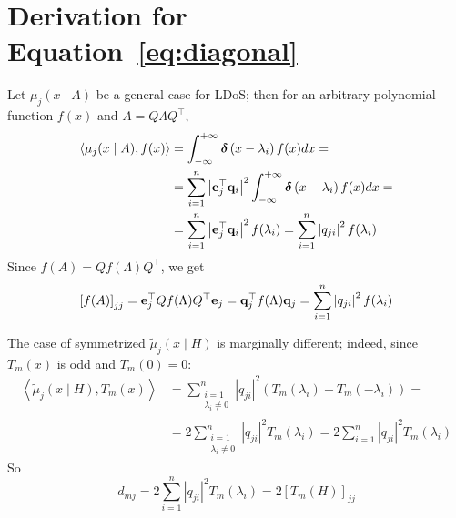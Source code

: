 \section{Derivation for Equation~\ref{eq:diagonal}}\label{app:eq11}

Let \( \mu_j ( x \mid A )  \) be a general case for LDoS; then for an arbitrary polynomial function \( f(x) \) and \( A = Q \Lambda Q^\top \),
\begin{equation}
   \begin{aligned}
         \left\langle  \mu_j ( x \mid A ), f(x) \right\rangle & = \int_{-\infty}^{+\infty}  \bm\delta \left( x - \lambda_i \right) f(x) dx = \\
         & = \sum_{i=1}^{n} \left| \mathbf{e}_j^\top \mathbf{q}_i \right|^2 \int_{-\infty}^{+\infty}  \bm\delta \left( x - \lambda_i \right) f(x) dx = \\
         & = \sum_{i=1}^{n} \left| \mathbf{e}_j^\top \mathbf{q}_i \right|^2 f(\lambda_i) =  \sum_{i=1}^{n} \left| q_{ji} \right|^2 f(\lambda_i) 
   \end{aligned}
\end{equation}
Since \( f(A) = Q f(\Lambda) Q^\top \), we get
\begin{equation}
      \left[ f(A) \right]_{jj} = \mathbf{e}_j^\top Q f(\Lambda) Q^\top \mathbf{e}_j = \mathbf{q}_j^\top f(\Lambda) \mathbf{q}_j = \sum_{i=1}^{n} \left| q_{ji} \right|^2 f(\lambda_i)  
\end{equation}
 
The case of symmetrized \( \tilde \mu_j ( x \mid H ) \) is marginally different; indeed, since \( T_m(x) \) is odd and \( T_m(0) = 0 \):
\begin{equation}
      \begin{aligned}
            \left\langle  \tilde \mu_j ( x \mid H ), T_m(x) \right\rangle & = \sum_{\substack{i=1 \\ \lambda_i \ne 0 }}^{n} \left| q_{ji} \right|^2 \left( T_m(\lambda_i) - T_m(-\lambda_i) \right) = \\
            & = 2 \sum_{\substack{i=1 \\ \lambda_i \ne 0 }}^{n} \left| q_{ji} \right|^2 T_m(\lambda_i) = 2 \sum_{i=1}^{n} \left| q_{ji} \right|^2 T_m(\lambda_i) 
      \end{aligned}
\end{equation}
So 
\begin{equation} 
      d_{mj} = 2 \sum_{i=1}^{n} \left| q_{ji} \right|^2 T_m(\lambda_i) = 2 \left[ T_m(H) \right]_{jj}
\end{equation}


